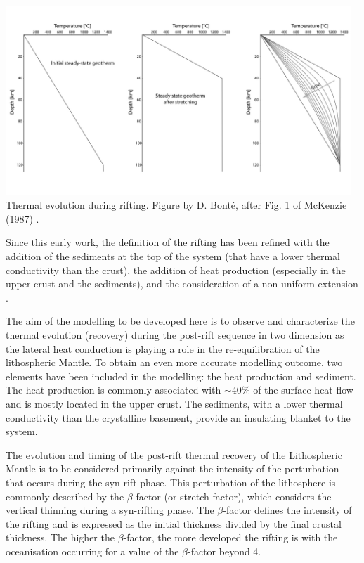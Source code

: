 \begin{center}
\includegraphics[width=13cm]{python_codes/fieldstone_86/images/eqcurve.jpg}\\
{\captionfont Thermal evolution during rifting. 
Figure by D. Bont{\'e}, after Fig. 1 of McKenzie (1987) \cite{mcke78}.}
\end{center}

Since this early work, the definition of the rifting has been 
refined with the addition of the sediments at the top of the system 
(that have a lower thermal conductivity than the crust), 
the addition of heat production (especially in the upper crust and the sediments), 
and the consideration of a non-uniform extension \cite{roke80}.

The aim of the modelling to be developed here is to observe and characterize the thermal 
evolution (recovery) during the post-rift sequence in two dimension as the lateral heat 
conduction is playing a role in the re-equilibration of the lithospheric Mantle. To obtain 
an even more accurate modelling outcome, two elements have been included in the modelling: 
the heat production and sediment. The heat production is commonly associated with $\sim$40\% 
of the surface heat flow and is mostly located in the upper crust. The sediments, with a lower thermal 
conductivity than the crystalline basement, provide an insulating blanket to the system. 

The evolution and timing of the post-rift  thermal recovery of the Lithospheric Mantle 
is to be considered primarily against the intensity of the perturbation that occurs during 
the syn-rift phase. This perturbation of the lithosphere is commonly described by 
the $\beta$-factor (or stretch factor), which considers the vertical thinning during 
a syn-rifting phase. The $\beta$-factor defines the intensity of the rifting and 
is expressed as the initial thickness divided by the final crustal thickness. 
The higher the $\beta$-factor, the more developed the rifting is with the oceanisation 
occurring for a value of the $\beta$-factor beyond 4.

